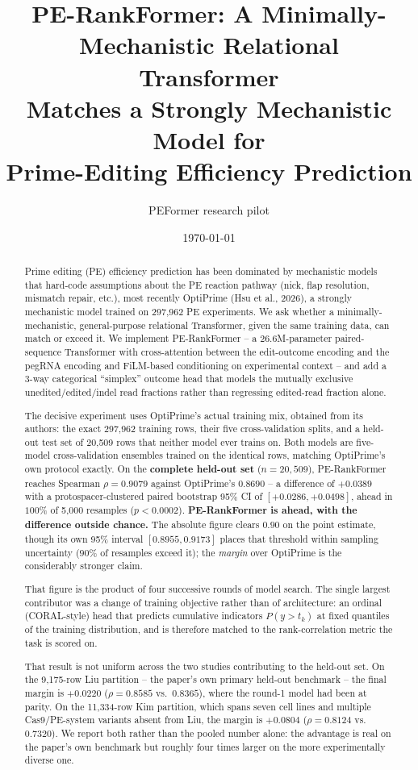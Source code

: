 \documentclass[11pt]{article}
\title{PE-RankFormer: A Minimally-Mechanistic Relational Transformer\\
Matches a Strongly Mechanistic Model for\\
Prime-Editing Efficiency Prediction}
\author{PEFormer research pilot}
\date{\today}
\begin{document}
\maketitle

\begin{abstract}
Prime editing (PE) efficiency prediction has been dominated by mechanistic models
that hard-code assumptions about the PE reaction pathway (nick, flap resolution,
mismatch repair, etc.), most recently OptiPrime (Hsu et al., 2026), a strongly
mechanistic model trained on 297{,}962 PE experiments. We ask whether a
minimally-mechanistic, general-purpose relational Transformer, given the same
training data, can match or exceed it. We implement PE-RankFormer -- a
26.6M-parameter paired-sequence Transformer with cross-attention between the
edit-outcome encoding and the pegRNA encoding and FiLM-based conditioning on
experimental context -- and add a 3-way categorical ``simplex'' outcome head that
models the mutually exclusive unedited/edited/indel read fractions rather than
regressing edited-read fraction alone.

The decisive experiment uses OptiPrime's actual training mix, obtained from its
authors: the exact 297{,}962 training rows, their five cross-validation splits,
and a held-out test set of 20{,}509 rows that neither model ever trains on. Both
models are five-model cross-validation ensembles trained on the identical rows,
matching OptiPrime's own protocol exactly. On the \textbf{complete held-out set}
($n=20{,}509$), PE-RankFormer reaches Spearman $\rho=\mathbf{0.9079}$ against
OptiPrime's $0.8690$ -- a difference of $+0.0389$ with a protospacer-clustered
paired bootstrap 95\% CI of $[+0.0286, +0.0498]$, ahead in $100\%$ of 5{,}000
resamples ($p<0.0002$). \textbf{PE-RankFormer is ahead, with the difference
outside chance.} The absolute figure clears $0.90$ on the point estimate, though
its own 95\% interval $[0.8955, 0.9173]$ places that threshold within sampling
uncertainty ($90\%$ of resamples exceed it); the \emph{margin} over OptiPrime is
the considerably stronger claim.

That figure is the product of four successive rounds of model search. The
single largest contributor was a change of training objective rather than of
architecture: an ordinal (CORAL-style) head that predicts cumulative indicators
$P(y>t_k)$ at fixed quantiles of the training distribution, and is therefore
matched to the rank-correlation metric the task is scored on.

That result is not uniform across the two studies contributing to the held-out
set. On the 9{,}175-row Liu partition -- the paper's own primary held-out
benchmark -- the final margin is $+0.0220$ ($\rho=0.8585$ vs.\ $0.8365$), where
the round-1 model had been at parity. On the 11{,}334-row Kim partition, which
spans seven cell lines and multiple Cas9/PE-system variants absent from Liu, the
margin is $+0.0804$ ($\rho=0.8124$ vs.\ $0.7320$). We report both rather than the
pooled number alone: the advantage is real on the paper's own benchmark but
roughly four times larger on the more experimentally diverse one.


\end{abstract}
\end{document}
